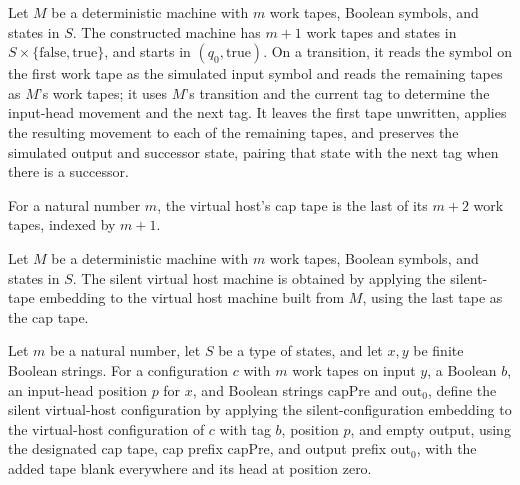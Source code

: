 \begin{definition}
\label{Turing.vhostEmitTM}
\leanok
{}
Let $M$ be a deterministic machine with $m$ work tapes, Boolean symbols, and states in
$S$. The constructed machine has $m+1$ work tapes and states in
$S\times\{\mathrm{false},\mathrm{true}\}$, and starts in $(q_0,\mathrm{true})$. On a
transition, it reads the symbol on the first work tape as the simulated input symbol and
reads the remaining tapes as $M$’s work tapes; it uses $M$’s transition and the current
tag to determine the input-head movement and the next tag. It leaves the first tape
unwritten, applies the resulting movement to each of the remaining tapes, and preserves
the simulated output and successor state, pairing that state with the next tag when
there is a successor.
\end{definition}

\begin{definition}
\label{Turing.vhostCap}
\leanok
For a natural number $m$, the virtual host’s cap tape is the last of its $m+2$ work
tapes, indexed by $m+1$.
\end{definition}

\begin{definition}
\label{Turing.vhostSilentTM}
\leanok
{}
Let $M$ be a deterministic machine with $m$ work tapes, Boolean symbols, and states in
$S$. The silent virtual host machine is obtained by applying the silent-tape embedding
to the virtual host machine built from $M$, using the last tape as the cap tape.
\end{definition}

\begin{definition}
\label{Turing.vhostSilentCfg}
\leanok
{}
Let $m$ be a natural number, let $S$ be a type of states, and let $x,y$ be finite
Boolean strings. For a configuration $c$ with $m$ work tapes on input $y$, a Boolean
$b$, an input-head position $p$ for $x$, and Boolean strings $\mathrm{capPre}$ and
$\mathrm{out}_0$, define the silent virtual-host configuration by applying the
silent-configuration embedding to the virtual-host configuration of $c$ with tag $b$,
position $p$, and empty output, using the designated cap tape, cap prefix
$\mathrm{capPre}$, and output prefix $\mathrm{out}_0$, with the added tape blank
everywhere and its head at position zero.
\end{definition}

